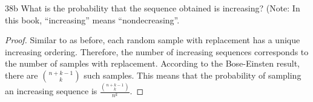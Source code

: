 \begin{exercise}{38b}
What is the probability that the sequence obtained is increasing? (Note: In this
book, “increasing” means “nondecreasing”.
\end{exercise}

\begin{proof}
    Similar to as before, each random sample with replacement has a unique increasing ordering. Therefore, the number of increasing sequences corresponds to the number of samples with replacement. According to the Bose-Einsten result, there are ${{n+k-1} \choose {k}}$ such samples. This means that the probability of sampling an increasing sequence is $\frac{{{n+k-1} \choose {k}}}{n^k}$.
\end{proof}

